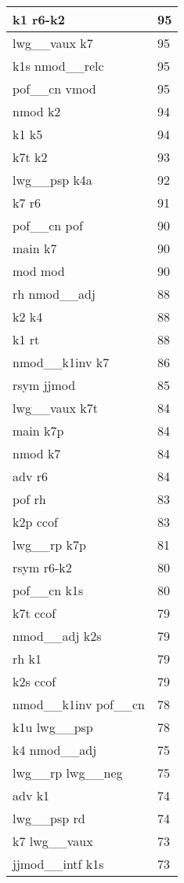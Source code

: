 \documentclass[a4 paper]{article}
\begin{document}
\begin{longtable}{p{}p{}}
k1 r6-k2  & 95 \\ \midrule
lwg\_\_vaux k7  & 95 \\ \midrule
k1s nmod\_\_relc  & 95 \\ \midrule
pof\_\_cn vmod  & 95 \\ \midrule
nmod k2  & 94 \\ \midrule
k1 k5  & 94 \\ \midrule
k7t k2  & 93 \\ \midrule
lwg\_\_psp k4a  & 92 \\ \midrule
k7 r6  & 91 \\ \midrule
pof\_\_cn pof  & 90 \\ \midrule
main k7  & 90 \\ \midrule
mod mod  & 90 \\ \midrule
rh nmod\_\_adj  & 88 \\ \midrule
k2 k4  & 88 \\ \midrule
k1 rt  & 88 \\ \midrule
nmod\_\_k1inv k7  & 86 \\ \midrule
rsym jjmod  & 85 \\ \midrule
lwg\_\_vaux k7t  & 84 \\ \midrule
main k7p  & 84 \\ \midrule
nmod k7  & 84 \\ \midrule
adv r6  & 84 \\ \midrule
pof rh  & 83 \\ \midrule
k2p ccof  & 83 \\ \midrule
lwg\_\_rp k7p  & 81 \\ \midrule
rsym r6-k2  & 80 \\ \midrule
pof\_\_cn k1s  & 80 \\ \midrule
k7t ccof  & 79 \\ \midrule
nmod\_\_adj k2s  & 79 \\ \midrule
rh k1  & 79 \\ \midrule
k2s ccof  & 79 \\ \midrule
nmod\_\_k1inv pof\_\_cn  & 78 \\ \midrule
k1u lwg\_\_psp  & 78 \\ \midrule
k4 nmod\_\_adj  & 75 \\ \midrule
lwg\_\_rp lwg\_\_neg  & 75 \\ \midrule
adv k1  & 74 \\ \midrule
lwg\_\_psp rd  & 74 \\ \midrule
k7 lwg\_\_vaux  & 73 \\ \midrule
jjmod\_\_intf k1s  & 73 \\ \midrule

\end{longtable}
\end{document}
